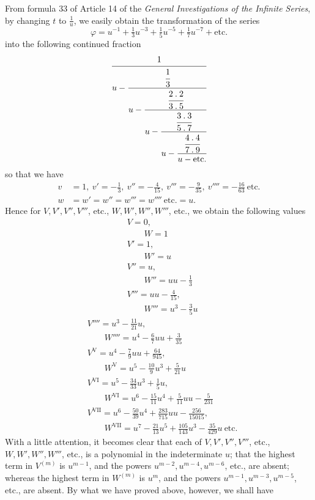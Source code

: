 From formula 33 of Article 14 of the \textit{General Investigations of the Infinite Series}, by changing $t$ to $\frac1u$, we easily obtain the transformation of the series
\[
\varphi=u^{-1}+\tfrac13u^{-3}+\tfrac15u^{-5}+\tfrac17u^{-7}+\text{etc.}
\]
into the following continued fraction
\[
\cfrac{1}{u-\cfrac{\cfrac13}{u-\cfrac{\cfrac{2\mathbin{.}2}{3\mathbin{.}5}}{u-\cfrac{\cfrac{3\mathbin{.}3}{5\mathbin{.}7}}{u-\cfrac{\cfrac{4\mathbin{.}4}{7\mathbin{.}9}}{u-\text{etc.}}}}}}
\]
so that we have
\[
\begin{aligned}
v&=1,\ v'=-\tfrac13,\ v''=-\tfrac4{15},\ v'''=-\tfrac9{35},\ v''''=-\tfrac{16}{63}\ \text{etc.}\\
w&=w'=w''=w'''=w''''\ \text{etc.}=u.
\end{aligned}
\]
Hence for $V,V',V'',V'''$, etc., $W,W',W'',W'''$, etc., we obtain the following values
\[
\begin{aligned}&V=0,\\[5pt]&\qquad W=1\\[5pt]&V'=1,\\[5pt]&\qquad W'=u\\[5pt]&V''=u,\\[5pt]&\qquad W''=uu-\tfrac13\\[5pt]&V'''=uu-\tfrac4{15},\\[5pt]&\qquad W'''=u^3-\tfrac35u\end{aligned}\]
\[\begin{aligned}&V''''=u^3-\tfrac{11}{21}u,\\[5pt]&\qquad W''''=u^4-\tfrac67uu+\tfrac3{35}\\[5pt]&V^{\mathrm{V}}=u^4-\tfrac79uu+\tfrac{64}{945},\\[5pt]&\qquad W^{\mathrm{V}}=u^5-\tfrac{10}{9}u^3+\tfrac5{21}u\\[5pt]&V^{\mathrm{VI}}=u^5-\tfrac{34}{33}u^3+\tfrac15u,\\[5pt]&\qquad W^{\mathrm{VI}}=u^6-\tfrac{15}{11}u^4+\tfrac5{11}uu-\tfrac5{231}\\[5pt]&V^{\mathrm{VII}}=u^6-\tfrac{50}{39}u^4+\tfrac{283}{715}uu-\tfrac{256}{15015},\\[5pt]&\qquad W^{\mathrm{VII}}=u^7-\tfrac{21}{13}u^5+\tfrac{105}{143}u^3-\tfrac{35}{429}u\ \text{etc.}\end{aligned}
\]
With a little attention, it becomes clear that each of $V,V',V'',V'''$, etc., $W,W',W'',W'''$, etc., is a polynomial in the indeterminate $u$; that the highest term in $V^{(m)}$ is $u^{m-1}$, and the powers $u^{m-2},u^{m-4},u^{m-6}$, etc., are absent; whereas the highest term in $W^{(m)}$ is $u^m$, and the powers $u^{m-1},u^{m-3},u^{m-5}$, etc., are absent. By what we have proved above, however, we shall have
